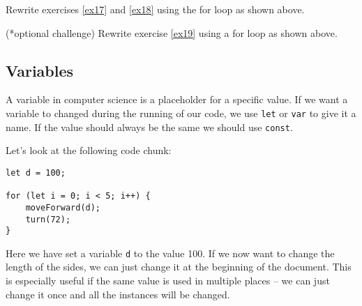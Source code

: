 \documentclass[11pt,a4paper]{report}
\begin{document}
\begin{ex}
Rewrite exercises \ref{ex17} and \ref{ex18} using the for loop as shown above.
\end{ex}


\begin{ex}
(*optional challenge) Rewrite exercise \ref{ex19} using a for loop as shown above. 
\end{ex}

\subsection{Variables}
A variable in computer science is a placeholder for a specific value. If we want a variable to changed during the running of our code, we use \verb|let| or \verb|var| to give it a name. If the value should always be the same we should use \verb|const|.  


\newpage
Let's look at the following code chunk:
\begin{verbatim}
let d = 100;

for (let i = 0; i < 5; i++) {
	moveForward(d);
	turn(72);
}
\end{verbatim}

Here we have set a variable \verb|d| to the value 100. If we now want to change the length of the sides, we can just change it at the beginning of the document. This is especially useful if the same value is used in multiple places -- we can just change it once and all the instances will be changed.

\end{document}
